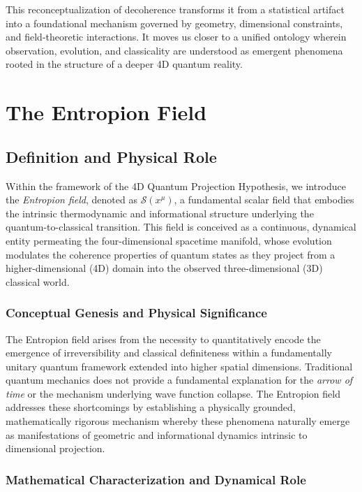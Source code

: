 \documentclass[12pt]{article}
\begin{document}
This reconceptualization of decoherence transforms it from a statistical artifact into a foundational mechanism governed by geometry, dimensional constraints, and field-theoretic interactions. It moves us closer to a unified ontology wherein observation, evolution, and classicality are understood as emergent phenomena rooted in the structure of a deeper 4D quantum reality.


\section{The Entropion Field}
\subsection{Definition and Physical Role}

Within the framework of the 4D Quantum Projection Hypothesis, we introduce the \textit{Entropion field}, denoted as $\mathcal{S}(x^\mu)$, a fundamental scalar field that embodies the intrinsic thermodynamic and informational structure underlying the quantum-to-classical transition. This field is conceived as a continuous, dynamical entity permeating the four-dimensional spacetime manifold, whose evolution modulates the coherence properties of quantum states as they project from a higher-dimensional (4D) domain into the observed three-dimensional (3D) classical world.

\subsubsection*{Conceptual Genesis and Physical Significance}

The Entropion field arises from the necessity to quantitatively encode the emergence of irreversibility and classical definiteness within a fundamentally unitary quantum framework extended into higher spatial dimensions. Traditional quantum mechanics does not provide a fundamental explanation for the \textit{arrow of time} or the mechanism underlying wave function collapse. The Entropion field addresses these shortcomings by establishing a physically grounded, mathematically rigorous mechanism whereby these phenomena naturally emerge as manifestations of geometric and informational dynamics intrinsic to dimensional projection.

\subsubsection*{Mathematical Characterization and Dynamical Role}
\end{document}
